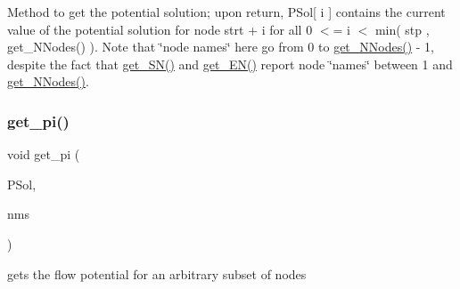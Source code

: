 Method to get the potential solution; upon return, P\+Sol\mbox{[} i \mbox{]} contains the current value of the potential solution for node strt + i for all 0 $<$= i $<$ min( stp , get\+\_\+\+N\+Nodes() ). Note that \char`\"{}node names\char`\"{} here go from 0 to \mbox{\hyperlink{class_s_m_spp__di__unipi__it_1_1_m_c_f_block_afff9080606a5612d33ba20c39d663839}{get\+\_\+\+N\+Nodes()}} -\/ 1, despite the fact that \mbox{\hyperlink{class_s_m_spp__di__unipi__it_1_1_m_c_f_block_a48ce277b5dac05d54aa2281fa4595c7b}{get\+\_\+\+S\+N()}} and \mbox{\hyperlink{class_s_m_spp__di__unipi__it_1_1_m_c_f_block_a34619412f7c801aadfa0b083a6efda36}{get\+\_\+\+E\+N()}} report node \char`\"{}names\char`\"{} between 1 and \mbox{\hyperlink{class_s_m_spp__di__unipi__it_1_1_m_c_f_block_afff9080606a5612d33ba20c39d663839}{get\+\_\+\+N\+Nodes()}}. \mbox{\label{class_s_m_spp__di__unipi__it_1_1_m_c_f_block_ab1ec41f3f3cce072e80fdd7887884049}} 
\subsubsection{\texorpdfstring{get\+\_\+pi()}{get\_pi()}\hspace{0.1cm}{\footnotesize\ttfamily [2/3]}}
{\footnotesize\ttfamily void get\+\_\+pi (\begin{DoxyParamCaption}\item[{\mbox{\hyperlink{class_s_m_spp__di__unipi__it_1_1_m_c_f_block_a9a7c9495f1f1feab22f3c556b70f60f0}{Vec\+\_\+\+C\+Number}} \&}]{P\+Sol,  }\item[{\mbox{\hyperlink{class_s_m_spp__di__unipi__it_1_1_m_c_f_block_a03461123d4f6090aefeb97ef653d3f2b}{c\+\_\+\+Vec\+\_\+\+Index}} \&}]{nms }\end{DoxyParamCaption})}



gets the flow potential for an arbitrary subset of nodes 

